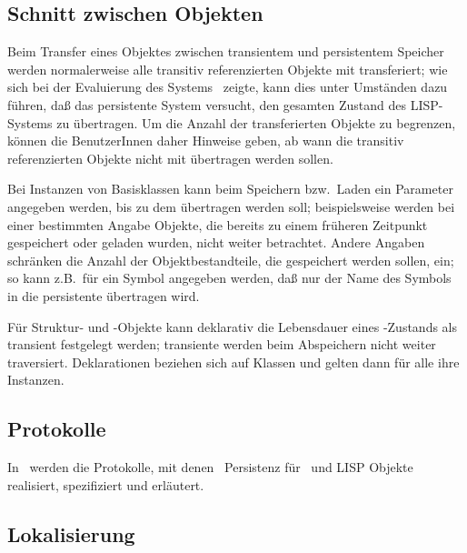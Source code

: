 \subsection{Schnitt zwischen Objekten}
%
Beim Transfer eines Objektes zwischen transientem und persistentem
Speicher werden normalerweise alle transitiv referenzierten Objekte
mit transferiert; wie sich bei der Evaluierung des Systems
\soh\ zeigte, kann dies unter Umst\"{a}nden dazu f\"{u}hren, da\ss{} das
persistente System versucht, den gesamten Zustand des LISP-Systems zu
\"{u}bertragen. Um die Anzahl der transferierten Objekte zu begrenzen,
k\"{o}n\-nen die BenutzerInnen daher Hinweise geben, ab wann die transitiv
referenzierten Objekte nicht mit \"{u}bertragen werden sollen.
%
\par{}Bei Instanzen von Basisklassen kann beim Speichern bzw.\ Laden
ein Parameter angegeben werden, bis zu dem
\"{u}bertragen werden soll; beispielsweise werden bei einer bestimmten
Angabe Objekte, die bereits zu einem fr\"{u}heren Zeitpunkt
gespeichert oder geladen wurden, nicht weiter betrachtet. Andere
Angaben schr\"{a}nken die Anzahl der Objektbestandteile, die
gespeichert werden sollen, ein; so kann z.B.\ f\"{u}r ein Symbol
angegeben werden, da\ss{} nur der Name des Symbols in die
persistente \representation{} \"{u}bertragen wird.
%
\par{}F\"{u}r Struktur- und \clos-Objekte kann deklarativ die
Lebensdauer eines \Slt\/-Zustands als transient festgelegt werden;
transiente \Slt[s]\/ werden beim Abspeichern nicht weiter traversiert.
Deklarationen beziehen sich auf Klassen und gelten dann f\"{u}r alle ihre
Instanzen.
%
\subsection{Protokolle}%
\label{sec:plpr}%
%
\ifbericht%
%
\let\nextstep\relax
In \cite[]{bib:ki94a}\ werden die Protokolle, mit
denen \plob\ Persistenz f\"{u}r \clos\ und LISP Objekte realisiert,
spezifiziert und erl\"{a}utert.
%
\else%
\def\nextstep{}%
\fi%
\nextstep%
%
\subsection{Lokalisierung}
%
